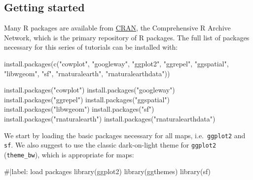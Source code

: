 \documentclass[
  letterpaper,
  DIV=11,
  numbers=noendperiod]{scrartcl}
\newenvironment{Shaded}{\begin{snugshade}}{\end{snugshade}}
\newcommand{\CommentTok}[1]{\textcolor[rgb]{0.37,0.37,0.37}{#1}}
\newcommand{\FunctionTok}[1]{\textcolor[rgb]{0.28,0.35,0.67}{#1}}
\newcommand{\NormalTok}[1]{\textcolor[rgb]{0.00,0.23,0.31}{#1}}
\newcommand{\StringTok}[1]{\textcolor[rgb]{0.13,0.47,0.30}{#1}}
\begin{document}
\hypertarget{getting-started}{%
\subsection{Getting started}\label{getting-started}}

Many R packages are available from
\href{https://cran.r-project.org/}{CRAN}, the Comprehensive R Archive
Network, which is the primary repository of R packages. The full list of
packages necessary for this series of tutorials can be installed with:

\begin{Shaded}
\begin{Highlighting}[]
\FunctionTok{install.packages}\NormalTok{(}\FunctionTok{c}\NormalTok{(}\StringTok{"cowplot"}\NormalTok{, }\StringTok{"googleway"}\NormalTok{, }\StringTok{"ggplot2"}\NormalTok{, }\StringTok{"ggrepel"}\NormalTok{,  }\StringTok{"ggspatial"}\NormalTok{, }\StringTok{"libwgeom"}\NormalTok{, }\StringTok{"sf"}\NormalTok{, }\StringTok{"rnaturalearth"}\NormalTok{, }\StringTok{"rnaturalearthdata"}\NormalTok{)) }

                 
\FunctionTok{install.packages}\NormalTok{(}\StringTok{"cowplot"}\NormalTok{)}
\FunctionTok{install.packages}\NormalTok{(}\StringTok{"googleway"}\NormalTok{)}
\FunctionTok{install.packages}\NormalTok{(}\StringTok{"ggrepel"}\NormalTok{)}
\FunctionTok{install.packages}\NormalTok{(}\StringTok{"ggspatial"}\NormalTok{)}
\FunctionTok{install.packages}\NormalTok{(}\StringTok{"libwgeom"}\NormalTok{)}
\FunctionTok{install.packages}\NormalTok{(}\StringTok{"sf"}\NormalTok{)}
\FunctionTok{install.packages}\NormalTok{(}\StringTok{"rnaturalearth"}\NormalTok{)}
\FunctionTok{install.packages}\NormalTok{(}\StringTok{"rnaturalearthdata"}\NormalTok{)                 }
\end{Highlighting}
\end{Shaded}

We start by loading the basic packages necessary for all maps,
i.e.~\texttt{ggplot2} and \texttt{sf}. We also suggest to use the
classic dark-on-light theme for \texttt{ggplot2} (\texttt{theme\_bw}),
which is appropriate for maps:

\begin{Shaded}
\begin{Highlighting}[]
\CommentTok{\#|label: load packages}
\FunctionTok{library}\NormalTok{(ggplot2)}
\FunctionTok{library}\NormalTok{(ggthemes)}
\FunctionTok{library}\NormalTok{(sf) }
\end{Highlighting}
\end{Shaded}
\end{document}
